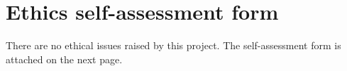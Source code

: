 \documentclass[../../main.tex]{subfiles}
\begin{document}
\chapter{Ethics self-assessment form}
\label{app:ethics_form}
There are no ethical issues raised by this project. 
The self-assessment form is attached on the next page.

\end{document}
